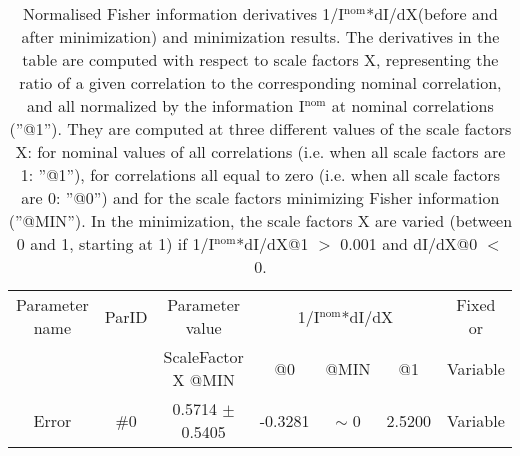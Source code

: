 \begin{table}[H]
\scriptsize
\begin{center}
\renewcommand{\arraystretch}{1.1}
\begin{tabular}{|c|c|c|ccc|c|}
\hline
Parameter name & ParID & Parameter value &\multicolumn{3}{|c|}{1/I$^\mathrm{nom}$*dI/dX} &Fixed or\\
 & & ScaleFactor X @MIN & @0 & @MIN & @1 & Variable\\
\hline
 {\tiny Error} & \#0 &    0.5714 $\pm$    0.5405 &   -0.3281 & {\tiny $\sim$ }0 &    2.5200 & Variable \\
\hline
\end{tabular}
\renewcommand{\arraystretch}{1}
\caption{Normalised Fisher information derivatives 1/I$^\mathrm{nom}$*dI/dX(before and after minimization) and minimization results.  The derivatives in the table are computed with respect to scale factors X, representing the ratio of a given correlation to the corresponding nominal correlation, and all normalized by the information I$^\mathrm{nom}$ at nominal correlations (''@1''). They are computed at three different values of the scale factors X: for nominal values of all correlations (i.e. when all scale factors are 1: ''@1''), for correlations all equal to zero (i.e. when all scale factors are 0: ''@0'') and for the scale factors minimizing Fisher information (''@MIN''). In the minimization, the scale factors X are varied (between 0 and 1, starting at 1) if 1/I$^\mathrm{nom}$*dI/dX@1 $>$ 0.001 and dI/dX@0 $<$ 0.}
\end{center}
\end{table}
